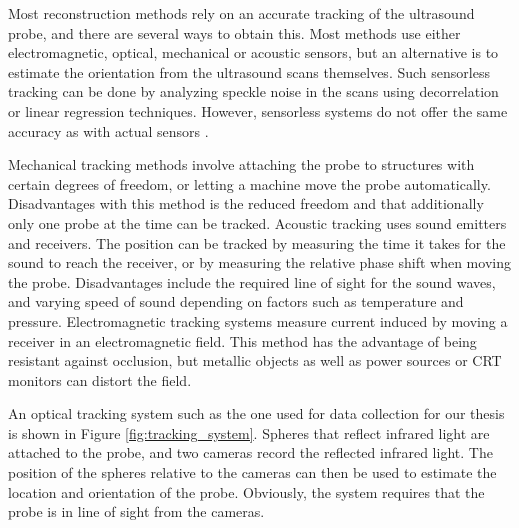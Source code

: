 Most reconstruction methods rely on an accurate tracking of the ultrasound probe, and there are several ways to obtain this. Most methods use either electromagnetic, optical, mechanical or acoustic sensors, but an alternative is to estimate the orientation from the ultrasound scans themselves. Such sensorless tracking can be done by analyzing speckle noise in the scans using decorrelation or linear regression techniques. However, sensorless systems do not offer the same accuracy as with actual sensors \cite{mercier2005}.

Mechanical tracking methods involve attaching the probe to structures with certain degrees of freedom, or letting a machine move the probe automatically. Disadvantages with this method is the reduced freedom and that additionally only one probe at the time can be tracked. Acoustic tracking uses sound emitters and receivers. The position can be tracked by measuring the time it takes for the sound to reach the receiver, or by measuring the relative phase shift when moving the probe. Disadvantages include the required line of sight for the sound waves, and varying speed of sound depending on factors such as temperature and pressure. Electromagnetic tracking systems measure current induced by moving a receiver in an electromagnetic field. This method has the advantage of being resistant against occlusion, but metallic objects as well as power sources or CRT monitors can distort the field.

An optical tracking system such as the one used for data collection for our thesis is shown in Figure \ref{fig:tracking_system}. Spheres that reflect infrared light are attached to the probe, and two cameras record the reflected infrared light. The position of the spheres relative to the cameras can then be used to estimate the location and orientation of the probe. Obviously, the system requires that the probe is in line of sight from the cameras.

